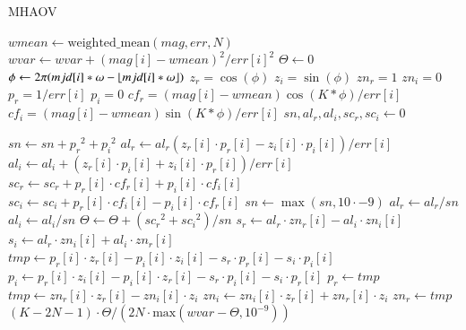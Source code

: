 \begin{algorithm}[H]
\caption{MHAOV}\label{alg:mhaov}
\begin{algorithmic}
    \State $wmean \gets \text{weighted\_mean}(mag, err, N)$ 
\State $wvar \gets wvar + (mag[i] - wmean)^{2}/err[i]^{2}$ 
\EndFor
\State $\Theta \gets 0$
    \State $\phi \gets 2 \pi (mjd[i]*\omega - \lfloor mjd[i]*\omega\rfloor)$
    \State $z_r = \cos(\phi)$ 
    \State $z_i = \sin(\phi)$ 
    \State $zn_r = 1$ 
    \State $zn_i = 0$
    \State $p_r = 1/err[i]$
    \State $p_i = 0$
    \State $cf_r = (mag[i] - wmean)\cos(K * \phi) / err[i]$
    \State $cf_i = (mag[i] - wmean)\sin(K * \phi) / err[i]$
\EndFor
{}
    \State $sn, al_r, al_i, sc_r, sc_i \gets 0$

    \State $sn \gets sn + {p_r}^{2}+ {p_i}^{2}  $
    \State $al_r \gets al_r (z_r[i] \cdot  p_r[i] - z_i[i] \cdot  p_i[i])/err[i]$ 
        \State $al_i \gets al_i + ( z_r[i] \cdot  p_i[i] + z_i[i] \cdot  p_r[i])/err[i]$
        \State $sc_r \gets sc_r + p_r[i] \cdot  cf_r[i] + p_i[i] \cdot  cf_i[i]$ 
        \State $sc_i \gets sc_i + p_r[i] \cdot  cf_i[i] - p_i[i] \cdot  cf_r[i]$
    \EndFor
    \State $sn \gets \max(sn, 10\cdot {-9})$
    \State $al_r \gets al_r/sn$
    \State $al_i \gets al_i/sn$
    \State $\Theta \gets \Theta + ({sc_r}^{2} + {sc_i}^{2})/sn$
        \State $s_r \gets al_r \cdot zn_r[i] - al_i \cdot zn_i[i]$
        \State $s_i \gets al_r \cdot zn_i[i] + al_i \cdot zn_r[i]$
        \State $tmp \gets p_r[i]\cdot z_r[i] - p_i[i]\cdot z_i[i] - s_r\cdot p_r[i] - s_i\cdot p_i[i]$
        \State $p_i \gets p_r[i]\cdot z_i[i] - p_i[i]\cdot z_r[i] - s_r\cdot p_i[i] - s_i\cdot p_r[i]$ 
        \State $p_r \gets tmp$
        \State $tmp \gets zn_r[i] \cdot z_r[i] - zn_i[i] \cdot z_i$
        \State $zn_i \gets zn_i[i] \cdot z_r[i] + zn_r[i] \cdot z_i$ 
        \State $zn_r \gets tmp$
    \EndFor
\EndFor
\State \Return $(K-2N-1)\cdot \Theta / (2N\cdot \text{max}(wvar - \Theta, 10^{-9}))$

\end{algorithmic}
\end{algorithm}

